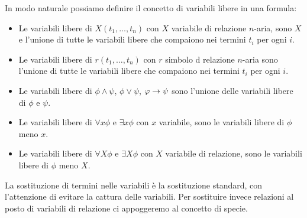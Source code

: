 \documentclass[]{marticle}
\begin{document}
In modo naturale possiamo definire il concetto di variabili libere in una
formula:
\begin{block}[Definizione]
    \begin{itemize} 
        \item Le variabili libere di $X(t_1, \dots, t_n)$ con $X$ variabile di
            relazione $n$-aria, sono $X$ e l'unione di tutte le variabili libere
            che compaiono nei termini $t_i$ per ogni $i$.
        \item Le variabili libere di $r(t_1, \dots, t_n)$ con $r$ simbolo d
            relazione $n$-aria sono l'unione di tutte le variabili libere che
            compaiono nei termini $t_i$ per ogni $i$.
        \item Le variabili libere di $\phi \land \psi$, $\phi \lor \psi$, $\varphi
            \rightarrow \psi$ sono l'unione delle variabili libere di $\phi$ e $\psi$.
        \item Le variabili libere di $\forall x \phi$ e $\exists x \phi$ con $x$
            variabile, sono le variabili libere di $\phi$ meno $x$.
        \item Le variabili libere di $\forall X \phi$ e $\exists X \phi$ con $X$
            variabile di relazione, sono le variabili libere di $\phi$ meno $X$.
    \end{itemize} 
\end{block}

La sostituzione di termini nelle variabili \`e la sostituzione standard, con
l'attenzione di evitare la cattura delle variabili. Per sostituire invece
relazioni al posto di variabili di relazione ci appoggeremo al concetto di
specie.
\end{document}
